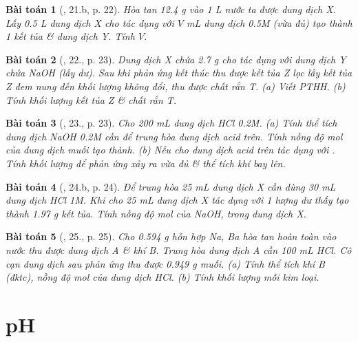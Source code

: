 \documentclass{article}
\newtheorem{baitoan}{Bài toán}
\begin{document}
\begin{baitoan}[\cite{An_350_BT_Hoa_Hoc_9}, 21.b, p. 22]
	Hòa tan \emph{12.4 g } vào \emph{1 L} nước ta được dung dịch X. Lấy \emph{0.5 L} dung dịch X cho tác dụng với $V$ \emph{mL} dung dịch \emph{ 0.5M} (vừa đủ) tạo thành 1 kết tủa \& dung dịch Y. Tính $V$.
\end{baitoan}

\begin{baitoan}[\cite{An_350_BT_Hoa_Hoc_9}, 22., p. 23]
	Dung dịch X chứa \emph{2.7 g } cho tác dụng với dung dịch Y chứa \emph{NaOH} (lấy dư). Sau khi phản ứng kết thúc thu được kết tủa Z lọc lấy kết tủa Z đem nung đến khối lượng không đổi, thu được chất rắn T. (a) Viết PTHH. (b) Tính khối lượng kết tủa Z \& chất rắn T.
\end{baitoan}

\begin{baitoan}[\cite{An_350_BT_Hoa_Hoc_9}, 23., p. 23]
	Cho \emph{200 mL} dung dịch \emph{HCl 0.2M}. (a) Tính thể tích dung dịch \emph{NaOH 0.2M} cần để trung hòa dung dịch acid trên. Tính nồng độ mol của dung dịch muối tạo thành. (b) Nếu cho dung dịch acid trên tác dụng với \emph{}. Tính khối lượng \emph{} để phản ứng xảy ra vừa đủ \& thể tích khí bay lên.
\end{baitoan}

\begin{baitoan}[\cite{An_350_BT_Hoa_Hoc_9}, 24.b, p. 24]
	Để trung hòa \emph{25 mL} dung dịch X cần dùng \emph{30 mL} dung dịch \emph{HCl 1M}. Khi cho \emph{25 mL} dung dịch X tác dụng với 1 lượng dư \emph{} thấy tạo thành \emph{1.97 g} kết tủa. Tính nồng độ mol của \emph{NaOH, } trong dung dịch X.
\end{baitoan}

\begin{baitoan}[\cite{An_350_BT_Hoa_Hoc_9}, 25., p. 25]
	Cho \emph{0.594 g} hỗn hợp \emph{Na, Ba} hòa tan hoàn toàn vào nước thu được dung dịch A \& khí B. Trung hòa dung dịch A cần \emph{100 mL HCl}. Cô cạn dung dịch sau phản ứng thu được \emph{0.949 g} muối. (a) Tính thể tích khí B (đktc), nồng độ mol của dung dịch \emph{HCl}. (b) Tính khối lượng mỗi kim loại.
\end{baitoan}


\section{pH}
\end{document}
